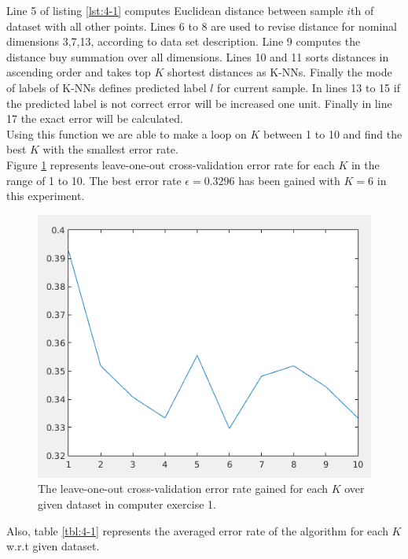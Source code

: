 \documentclass[12pt]{article}
\begin{document}
Line 5 of listing \ref{lst:4-1} computes Euclidean distance between sample $i$th of dataset with all other points. Lines 6 to 8 are used to revise distance for nominal dimensions 3,7,13, according to data set description. Line 9 computes the distance buy summation over all dimensions. Lines 10 and 11 sorts distances in ascending order and takes top $K$ shortest distances as K-NNs. Finally the mode of labels of K-NNs defines predicted label $l$ for current sample. In lines 13 to 15 if the predicted label is not correct error will be increased one unit. Finally in line 17 the exact error will be calculated.\\
Using this function we are able to make a loop on $K$ between 1 to 10 and find the best $K$ with the smallest error rate.\\
Figure \ref{fig:4-1} represents leave-one-out cross-validation error rate for each $K$ in the range of 1 to 10. The best error rate $\epsilon = 0.3296$ has been gained with $K = 6$ in this experiment.
\begin{figure}
\centering
\includegraphics[scale=0.4]{Imgs/4-1.png}
\caption{The leave-one-out cross-validation error rate gained for each $K$ over given dataset in computer exercise 1.}
\label{fig:4-1}
\end{figure}
Also, table \ref{tbl:4-1} represents the averaged error rate of the algorithm for each $K$ w.r.t given dataset.
\end{document}
